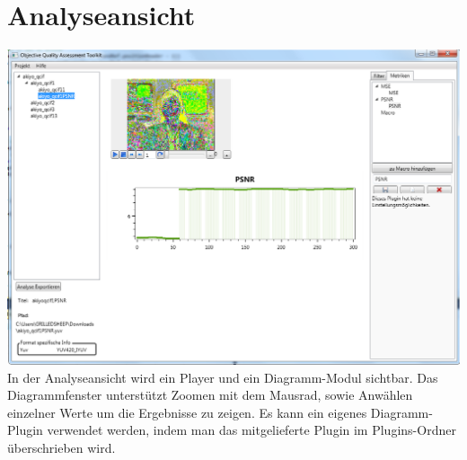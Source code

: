 \chapter{Analyseansicht}
\includegraphics[scale=0.55]{bilder/Analyse.png}\\[5ex]
In der Analyseansicht  wird ein Player und ein Diagramm-Modul sichtbar. Das Diagrammfenster unterstützt Zoomen mit dem Mausrad, sowie Anwählen einzelner Werte um die Ergebnisse zu zeigen.
Es kann ein eigenes Diagramm-Plugin verwendet werden, indem man das mitgelieferte Plugin im Plugins-Ordner überschrieben wird.
